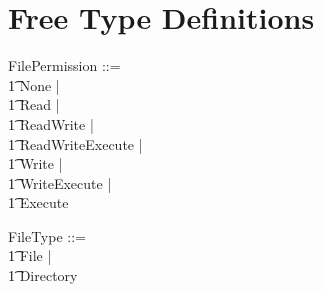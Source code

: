 \section{Free Type Definitions}

\begin{zed}
  FilePermission ::= \\
  \t1 None | \\
  \t1 Read | \\
  \t1 ReadWrite | \\
  \t1 ReadWriteExecute | \\
  \t1 Write | \\
  \t1 WriteExecute | \\
  \t1 Execute
\end{zed}

\begin{zed}
  FileType ::= \\
  \t1 File | \\
  \t1 Directory
\end{zed}
